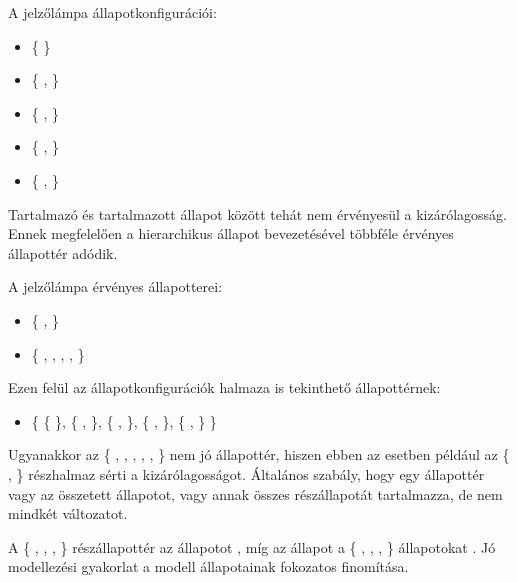 \begin{pelda}
A jelzőlámpa állapotkonfigurációi:

\begin{itemize}
\item \{  \}
\item \{ ,  \}
\item \{ ,  \}
\item \{ ,  \}
\item \{ ,  \}
\end{itemize}
\end{pelda}

Tartalmazó és tartalmazott állapot között tehát nem érvényesül a kizárólagosság. Ennek megfelelően a hierarchikus állapot bevezetésével többféle érvényes állapottér adódik.

\begin{pelda}
A jelzőlámpa érvényes állapotterei:

\begin{itemize}
	\item  \{ ,  \}
	\item  \{ , , , ,  \}
\end{itemize}

Ezen felül az állapotkonfigurációk halmaza is tekinthető állapottérnek:

\begin{itemize}
	\item \{ \{  \}, \{ ,  \}, \{ ,  \}, \{ ,  \}, \{ ,  \} \}
\end{itemize}

Ugyanakkor az \{ , , , , ,  \} nem jó állapottér, hiszen ebben az esetben például az \{ ,  \} részhalmaz sérti a kizárólagosságot. Általános szabály, hogy egy állapottér vagy az összetett állapotot, vagy annak összes részállapotát tartalmazza, de nem mindkét változatot.
\end{pelda}

A \{ , , ,  \} részállapottér az  állapotot , míg az  állapot a \{ , , ,  \} állapotokat . Jó modellezési gyakorlat a modell állapotainak fokozatos finomítása.

